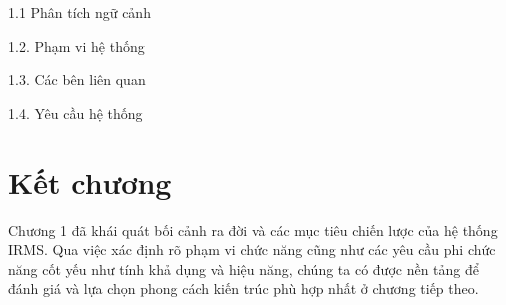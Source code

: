 {1.1 Phân tích ngữ cảnh}

{1.2. Phạm vi hệ thống}

{1.3. Các bên liên quan}

{1.4. Yêu cầu hệ thống}

\section{Kết chương}
Chương 1 đã khái quát bối cảnh ra đời và các mục tiêu chiến lược của hệ thống IRMS. Qua việc xác định rõ phạm vi chức năng cũng như các yêu cầu phi chức năng cốt yếu như tính khả dụng và hiệu năng, chúng ta có được nền tảng để đánh giá và lựa chọn phong cách kiến trúc phù hợp nhất ở chương tiếp theo.
